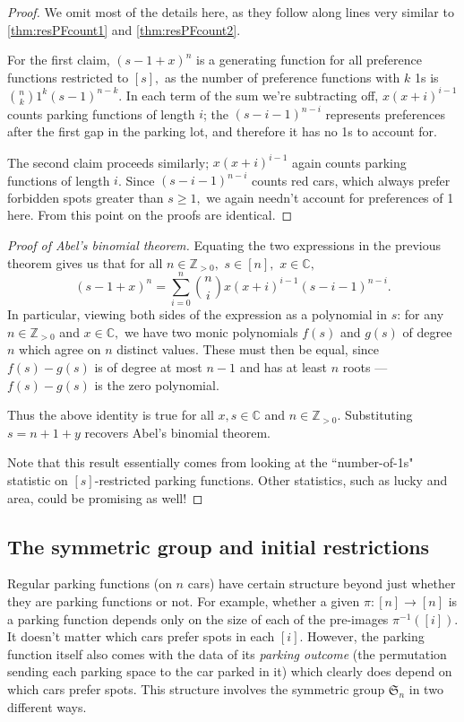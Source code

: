 \documentclass[12 pt]{amsart}
\theoremstyle{definition} %
\theoremstyle{remark} %
\begin{document}
\begin{proof}
    We omit most of the details here, as they follow along lines very similar to \cref{thm:resPFcount1} and \cref{thm:resPFcount2}.
    
    For the first claim, $(s-1+x)^n$ is a generating function for all preference functions restricted to $[s],$ as the number of preference functions with $k$ 1s is $\binom{n}{k}1^k(s-1)^{n-k}.$ In each term of the sum we're subtracting off, $x(x+i)^{i-1}$  counts parking functions of length $i$; the $(s-i-1)^{n-i}$ represents preferences after the first gap in the parking lot, and therefore it has no 1s to account for.

    The second claim proceeds similarly; $x(x+i)^{i-1}$ again counts parking functions of length $i$. Since $(s-i-1)^{n-i}$ counts red cars, which always prefer forbidden spots greater than $s\ge1,$ we again needn't account for preferences of 1 here. From this point on the proofs are identical.
\end{proof}

\begin{proof}[Proof of Abel's binomial theorem]
	Equating the two expressions in the previous theorem gives us that for all $n\in\mathbb{Z}_{>0},$ $s\in [n],$ $x\in\mathbb{C},$
	\[
		(s-1+x)^{n} = \sum_{i = 0}^{n} \binom{n}{i} x(x + i)^{i - 1} (s - i - 1)^{n - i}.
	\]
In particular, viewing both sides of the expression as a polynomial in $s$: for any $n\in\mathbb{Z}_{>0}$ and $x\in\mathbb{C},$ we have two monic polynomials $f(s)$ and $g(s)$ of degree $n$ which agree on $n$ distinct values. These must then be equal, since $f(s)-g(s)$ is of degree at most $n-1$ and has at least $n$ roots --- $f(s) - g(s)$ is the zero polynomial.

Thus the above identity is true for all $x,s\in\mathbb{C}$ and $n\in\mathbb{Z}_{>0}$. Substituting $s=n+1+y$ recovers Abel's binomial theorem.

Note that this result essentially comes from looking at the ``number-of-1s" statistic on $[s]$-restricted parking functions. Other statistics, such as lucky and area, could be promising as well!

\end{proof}

\subsection*{The symmetric group and initial restrictions}

Regular parking functions (on $n$ cars) have certain structure beyond just whether they are parking functions or not. For example, whether a given $\pi : [n] \to [n]$ is a parking function depends only on the size of each of the pre-images $\pi^{-1}([i])$. It doesn't matter which cars prefer spots in each $[i]$. However, the parking function itself also comes with the data of its \emph{parking outcome} (the permutation sending each parking space to the car parked in it) which clearly does depend on which cars prefer spots. This structure involves the symmetric group $\mathfrak{S}_{n}$ in two different ways.
\end{document}
